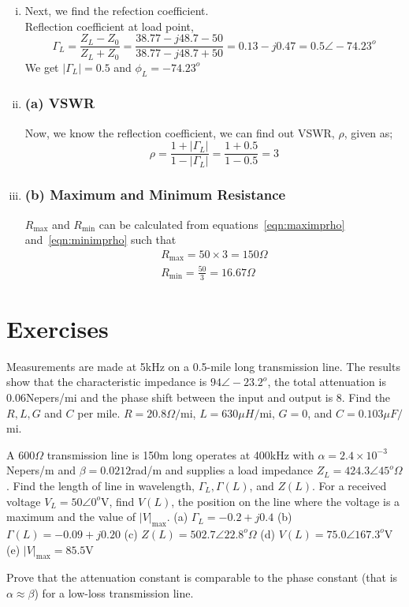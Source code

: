 \begin{exmp}
\begin{enumerate}[(i)]
\item Next, we find the refection coefficient.\\
Reflection coefficient at load point,
\begin{dmath*}
\Gamma_{L}=\frac{Z_{L}-Z_{0}}{Z_{L}+Z_{0}}
= \frac{38.77-j48.7-50}{38.77-j48.7+50}
=0.13-j0.47 = 0.5\angle-74.23^o
\end{dmath*}
We get $|\Gamma_{L}|=0.5$ and $\phi_L = -74.23^o$

\item 
\subsubsection*{(a) VSWR}
Now, we know the reflection coefficient, we can find out VSWR, $\rho$, given as;
\begin{dmath*}
\rho=\frac{1 + |\Gamma_{L}|}{1-|\Gamma_{L}|}=\frac{1+0.5}{1-0.5} = 3
\end{dmath*}

\item 
\subsubsection*{(b) Maximum and Minimum Resistance}
$R_\max$ and $R_\min$ can be calculated from equations~\eqref{eqn:maximprho} and~\eqref{eqn:minimprho} such that
\begin{align*}
R_\max = 50 \times 3 = 150\Omega\\
R_\min = \frac{50}{3} = 16.67\Omega
\end{align*}
\end{enumerate}
\end{exmp}

\section*{Exercises}
\begin{ExerciseList}
\Exercise[label={ex51}]
Measurements are made at 5kHz on a 0.5-mile long transmission line. The results show that the characteristic impedance is $94\angle-23.2^o$, the total attenuation is 0.06Nepers/mi and the phase shift between the input and output is 8\textdegree. Find the $R, L, G$ and $C$ per mile.
\Answer[ref={ex51}]
$R = 20.8\varOmega/$mi, $L = 630\mu H/$mi, $G = 0$, and $C = 0.103\mu F/$mi.

\Exercise[label={ex52}]
A 600$\varOmega$ transmission line is 150m long operates at 400kHz with $\alpha = 2.4\times10^{-3}$Nepers/m and $\beta = 0.0212$rad/m and supplies a load impedance $Z_L = 424.3\angle45^o\varOmega$. Find the length of line in wavelength, $\Gamma_L, \Gamma(L)$, and $Z(L)$. For a received voltage $V_L = 50\angle0^o$V, find $V(L)$, the position on the line where the voltage is a maximum and the value of $|V|_\max$.
\Answer[ref={ex52}]
(a) $\Gamma_L = -0.2 + j0.4$ (b) $\Gamma(L) = -0.09 + j0.20$ (c) $Z(L) = 502.7\angle22.8^o\varOmega$ (d) $V(L) = 75.0\angle167.3^o$V (e) $|V|_\max = 85.5$V

\Exercise[label={ex53}]
Prove that the attenuation constant is comparable to the phase constant (that is $\alpha\approx\beta$) for a low-loss transmission line.
\end{ExerciseList}
